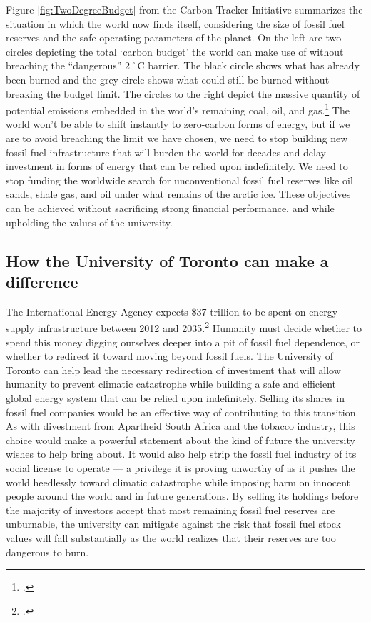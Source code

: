 Figure \ref{fig:TwoDegreeBudget} from the Carbon Tracker Initiative summarizes the situation in which the world now finds itself, considering the size of fossil fuel reserves and the safe operating parameters of the planet.
On the left are two circles depicting the total `carbon budget' the world can make use of without breaching the ``dangerous'' 2˚C barrier.
The black circle shows what has already been burned and the grey circle shows what could still be burned without breaking the budget limit.
The circles to the right depict the massive quantity of potential  emissions embedded in the world's remaining coal, oil, and gas.\footcite[][p. 6]{CTI2012}
The world won't be able to shift instantly to zero-carbon forms of energy, but if we are to avoid breaching the limit we have chosen, we need to stop building new fossil-fuel infrastructure that will burden the world for decades and delay investment in forms of energy that can be relied upon indefinitely.
We need to stop funding the worldwide search for unconventional fossil fuel reserves like oil sands, shale gas, and oil under what remains of the arctic ice.
These objectives can be achieved without sacrificing strong financial performance, and while upholding the values of the university. 




\subsection{How the University of Toronto can make a difference}



The International Energy Agency expects \$37 trillion to be spent on energy supply infrastructure between 2012 and 2035.\footcite[][]{IEA2012factsheet}
Humanity must decide whether to spend this money digging ourselves deeper into a pit of fossil fuel dependence, or whether to redirect it toward moving beyond fossil fuels.
The University of Toronto can help lead the necessary redirection of investment that will allow humanity to prevent climatic catastrophe while building a safe and efficient global energy system that can be relied upon indefinitely.
Selling its shares in fossil fuel companies would be an effective way of contributing to this transition.
As with divestment from Apartheid South Africa and the tobacco industry, this choice would make a powerful statement about the kind of future the university wishes to help bring about.
It would also help strip the fossil fuel industry of its social license to operate --- a privilege it is proving unworthy of as it pushes the world heedlessly toward climatic catastrophe while imposing harm on innocent people around the world and in future generations.
By selling its holdings before the majority of investors accept that most remaining fossil fuel reserves are unburnable, the university can mitigate against the risk that fossil fuel stock values will fall substantially as the world realizes that their reserves are too dangerous to burn.



